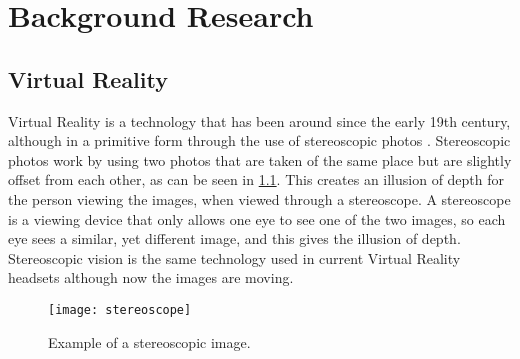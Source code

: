 \chapter{Background Research}
\label{chapter2}


\section{Virtual Reality}
	Virtual Reality is a technology that has been around since the early 19th century, although in a primitive form through the use of stereoscopic photos \cite{stereoscopy}. Stereoscopic photos work by using two photos that are taken of the same place but are slightly offset from each other, as can be seen in \ref{fig:stereoscope1}. This creates an illusion of depth for the person viewing the images, when viewed through a stereoscope. A stereoscope is a viewing device that only allows one eye to see one of the two images, so each eye sees a similar, yet different image, and this gives the illusion of depth. Stereoscopic vision is the same technology used in current Virtual Reality headsets although now the images are moving.

\begin{figure}[h]
	\texttt{[image: stereoscope]}
	\centering
	\caption{Example of a stereoscopic image.}
	\label{fig:stereoscope1}
\end{figure}

